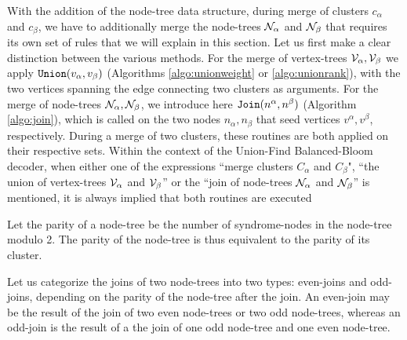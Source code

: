 With the addition of the node-tree data structure, during merge of clusters $c_\alpha$ and $c_\beta$, we have to additionally merge the node-trees $\mathcal{N}_{\alpha}$ and $\mathcal{N}_\beta$ that requires its own set of rules that we will explain in this section. Let us first make a clear distinction between the various methods. For the merge of vertex-trees $\mathcal{V}_\alpha, \mathcal{V}_\beta$ we apply $\texttt{Union}(v_\alpha, v_\beta)$ (Algorithms \ref{algo:unionweight} or \ref{algo:unionrank}), with the two vertices spanning the edge connecting two clusters as arguments. For the merge of node-trees $\mathcal{N}_\alpha, \mathcal{N}_\beta$, we introduce here $\texttt{Join}(n^\alpha, n^\beta)$ (Algorithm \ref{algo:join}), which is called on the two nodes $n_\alpha, n_\beta$ that seed vertices $v^\alpha, v^\beta$, respectively. During a merge of two clusters, these routines are both applied on their respective sets. Within the context of the Union-Find Balanced-Bloom decoder, when either one of the expressions ``merge clusters $C_\alpha$ and $C_\beta$", ``the union of vertex-trees $\mathcal{V}_\alpha$ and $\mathcal{V}_\beta$'' or the ``join of node-trees $\mathcal{N}_{\alpha}$ and $\mathcal{N}_\beta$'' is mentioned, it is always implied that both routines are executed

\begin{definition}\label{def:nodesetparity}
  Let the parity of a node-tree be the number of syndrome-nodes in the node-tree modulo 2. The parity of the node-tree is thus equivalent to the parity of its cluster. 
\end{definition}
\begin{definition}\label{def:oddevenjoin}
  Let us categorize the joins of two node-trees into two types: even-joins and odd-joins, depending on the parity of the node-tree after the join. An even-join may be the result of the join of two even node-trees or two odd node-trees, whereas an odd-join is the result of a the join of one odd node-tree and one even node-tree.
\end{definition}


